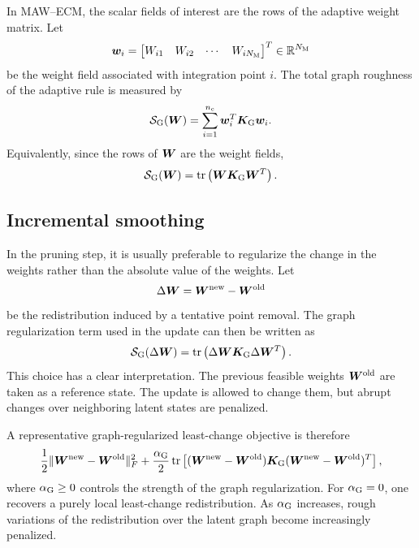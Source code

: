 \documentclass[11pt,a4paper]{article}
\begin{document}
In MAW--ECM, the scalar fields of interest are the rows of the adaptive weight
matrix. Let
\[
        \bm w_i =
        \begin{bmatrix}
        W_{i1} & W_{i2} & \cdots & W_{iN_{\mathrm{M}}}
        \end{bmatrix}^T
        \in\mathbb{R}^{N_{\mathrm{M}}}
\]
be the weight field associated with integration point $i$. The total graph
roughness of the adaptive rule is measured by
\[
        \mathcal{S}_{\mathrm{G}}(\bm W)
        =
        \sum_{i=1}^{n_{\mathrm{c}}}
        \bm w_i^T\bm K_{\mathrm{G}}\bm w_i.
        \label{eq:graph_energy_weights}
\]
Equivalently, since the rows of $\bm W$ are the weight fields,
\[
        \mathcal{S}_{\mathrm{G}}(\bm W)
        =
        \operatorname{tr}\left(
        \bm W\bm K_{\mathrm{G}}\bm W^T
        \right).
        \label{eq:graph_energy_trace}
\]

\subsection{Incremental smoothing}

In the pruning step, it is usually preferable to regularize the change in the
weights rather than the absolute value of the weights. Let
\[
        \Delta \bm W = \bm W^{\mathrm{new}}-\bm W^{\mathrm{old}}
\]
be the redistribution induced by a tentative point removal. The graph
regularization term used in the update can then be written as
\[
        \mathcal{S}_{\mathrm{G}}(\Delta \bm W)
        =
        \operatorname{tr}\left(
        \Delta \bm W\bm K_{\mathrm{G}}\Delta \bm W^T
        \right).
        \label{eq:incremental_graph_energy}
\]
This choice has a clear interpretation. The previous feasible weights
$\bm W^{\mathrm{old}}$ are taken as a reference state. The update is allowed to change them,
but abrupt changes over neighboring latent states are penalized.

A representative graph-regularized least-change objective is therefore
\[
        \frac{1}{2}\|\bm W^{\mathrm{new}}-\bm W^{\mathrm{old}}\|_F^2
        +
        \frac{\alpha_{\mathrm{G}}}{2}
        \operatorname{tr}\left[
        (\bm W^{\mathrm{new}}-\bm W^{\mathrm{old}})\bm K_{\mathrm{G}}(\bm W^{\mathrm{new}}-\bm W^{\mathrm{old}})^T
        \right],
        \label{eq:incremental_graph_objective}
\]
where $\alpha_{\mathrm{G}}\geq 0$ controls the strength of the graph regularization.
For $\alpha_{\mathrm{G}}=0$, one recovers a purely local least-change redistribution. As
$\alpha_{\mathrm{G}}$ increases, rough variations of the redistribution over the latent
graph become increasingly penalized.

\end{document}
